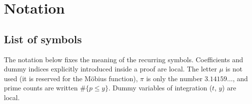 \documentclass[preprint,12pt]{elsarticle}
\numberwithin{equation}{section}
\theoremstyle{plain}
\theoremstyle{definition}
\theoremstyle{remark}
\begin{document}

\section{Notation}
\label{sec:notation}

\subsection{List of symbols}
\label{subsec:symbols}
The notation below fixes the meaning of the recurring symbols. Coefficients and dummy indices explicitly introduced inside a proof are local. The letter $\mu$ is not used (it is reserved for the M\"obius function), $\pi$ is only the number $3.14159\ldots$, and prime counts are written $\#\{p\le y\}$. Dummy variables of integration ($t$, $y$) are local.
\end{document}
